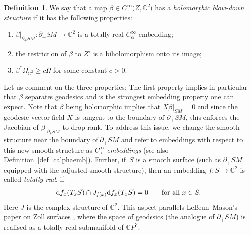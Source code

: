 \documentclass[pdftex]{sigma}
\numberwithin{equation}{section}
\theoremstyle{definition}
\newtheorem{Definition}[Theorem]{Definition}
\newcommand{\C}{\mathbb{C}} %
\newcommand{\1}{{\bf 1}}
\newcommand{\Om}{{\underline{\Omega}}}
\begin{document}
\begin{Definition}\label{def_bds}
We say that a map $\beta \in C^{\infty}\bigl(Z,\C^2\bigr)$ has a {\it holomorphic blow-down structure} if it has the following properties:
\begin{enumerate}[label=\rm(\roman*)]\itemsep=0pt
	\item\label{bds1} $\beta|_{\partial_{+}SM}\colon\partial_{+}SM\to \C^2$ is a totally real $C_\alpha^\infty$-embedding;
	
	\item\label{bds2} the restriction of $\beta$ to $Z^{\circ}$ is a biholomorphism onto its image;
	
	\item\label{bds3} $\beta^*\Omega_{\C^2}\ge c \Om$ for some constant $c>0$.
\end{enumerate}
\end{Definition}


Let us comment on the three properties: The first property implies in particular that $\beta$ separates geodesics and
is the strongest embedding property one can expect. Note that $\beta$ being holomorphic implies that $X\beta\vert_{SM}=0$ and since the geodesic vector field $X$ is tangent to the boundary of $\partial_+SM$, this enforces the Jacobian of $\beta|_{\partial_+SM}$ to drop rank. To address this issue, we change the smooth structure near the boundary of $\partial_+SM$ and refer to embeddings with respect to this new smooth structure as {\it $C_\alpha^\infty$-embeddings} (see also Definition~\ref{def_calphaemb}). Further, if~$S$ is a smooth surface (such as $\partial_+SM$ equipped with the adjusted smooth structure), then an embedding $f\colon S\rightarrow \C^2$ is called {\it totally real}, if
\[
	{\rm d}f_x(T_x S) \cap J_{f(x)} {\rm d}f_x(T_x S) = 0\qquad \text{for all} \  x\in S.
\]
Here $J$ is the complex structure of $\C^2$. This aspect parallels LeBrun--Mason's paper on Zoll surfaces \cite{LeMa02}, where the space of geodesics (the analogue of $\partial_+SM$) is realised as a totally real submanifold of $\C P^2$.
\end{document}

